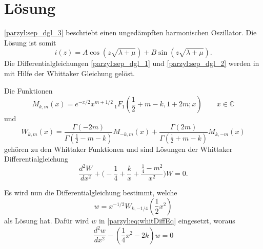 %
%
%
\section{Lösung
\label{parzyl:section:teil1}}

\eqref{parzyl:sep_dgl_3} beschriebt einen ungedämpften harmonischen Oszillator.
Die Lösung ist somit
\begin{equation}
	i(z) 
	= 
	A\cos{ 
		\left ( z
		\sqrt{\lambda + \mu}
		\right )}
	+
	B\sin{ 
		\left ( z
		\sqrt{\lambda + \mu}
		\right )}.
\end{equation}
Die Differentialgleichungen \eqref{parzyl:sep_dgl_1} und \eqref{parzyl:sep_dgl_2} werden in \cite{parzyl:whittaker}
mit Hilfe der Whittaker Gleichung gelöst.
\begin{definition}
    Die Funktionen
    \begin{equation*}
        M_{k,m}(x) = 
    e^{-x/2} x^{m+1/2} \,
    {}_{1} F_{1}
    (
        {\textstyle \frac{1}{2}} 
        + m - k, 1 + 2m; x) \qquad x \in \mathbb{C}
    \end{equation*}
    und
    \begin{equation*}
        W_{k,m}(x) = \frac{
            \Gamma \left( -2m\right)
        }{
            \Gamma \left( {\textstyle \frac{1}{2}} - m - k\right)
        }
        M_{-k, m} \left(x\right)
        +
        \frac{
            \Gamma \left( 2m\right)
        }{
            \Gamma \left( {\textstyle \frac{1}{2}} + m - k\right)
        }
        M_{k, -m} \left(x\right)
    \end{equation*}
    gehören zu den Whittaker Funktionen und sind Lösungen
    der Whittaker Differentialgleichung
    \begin{equation}
        \frac{d^2W}{d x^2} +
        \biggl( -\frac{1}{4}  + \frac{k}{x} + \frac{\frac{1}{4} - m^2}{x^2} \biggr) W = 0.
        \label{parzyl:eq:whitDiffEq}
    \end{equation}

\end{definition}
Es wird nun die Differentialgleichung bestimmt, welche
\begin{equation}
    w = x^{-1/2} W_{k,-1/4} \left({\textstyle \frac{1}{2}} x^2\right)
\end{equation}
als Lösung hat.
Dafür wird $w$ in \eqref{parzyl:eq:whitDiffEq} eingesetzt, woraus
\begin{equation}
    \frac{d^2 w}{dx^2} - \left(\frac{1}{4} x^2 - 2k\right) w = 0
\label{parzyl:eq:weberDiffEq}
\end{equation}
